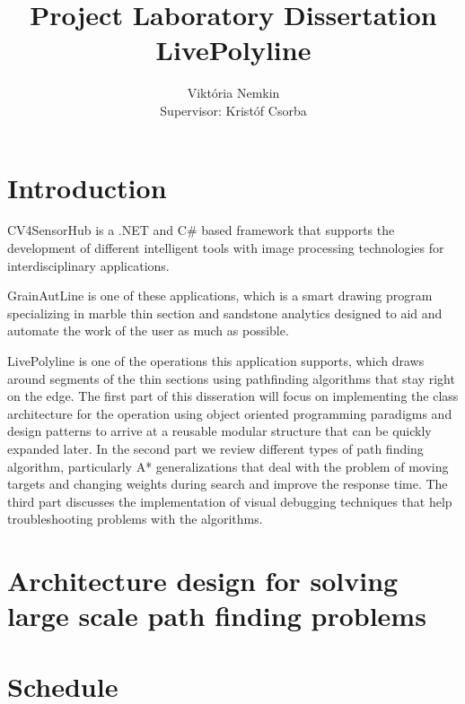 \documentclass[11pt,oneside]{article}
\author{Viktória Nemkin\\Supervisor: Kristóf Csorba}
\title{Project Laboratory Dissertation\\LivePolyline}
\begin{document}
\maketitle
\newpage
\tableofcontents
\newpage

\section{Introduction}

CV4SensorHub is a .NET and C\# based framework that supports the development of different intelligent tools with image processing technologies for interdisciplinary applications.

GrainAutLine is one of these applications, which is a smart drawing program specializing in marble thin section and sandstone analytics designed to aid and automate the work of the user as much as possible.

LivePolyline is one of the operations this application supports, which draws around segments of the thin sections using pathfinding algorithms that stay right on the edge. The first part of this disseration will focus on implementing the class architecture for the operation using object oriented programming paradigms and design patterns to arrive at a reusable modular structure that can be quickly expanded later. In the second part we review different types of path finding algorithm, particularly A* generalizations that deal with the problem of moving targets and changing weights during search and improve the response time. The third part discusses the implementation of visual debugging techniques that help troubleshooting problems with the algorithms.


\section{Architecture design for solving large scale path finding problems}




\section{Schedule}
\end{document}
